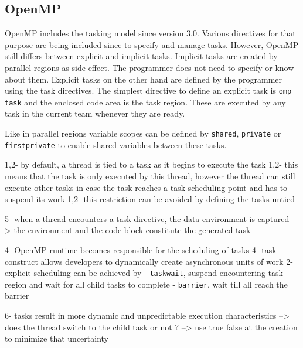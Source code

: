 \subsection{OpenMP}
\label{subsec:OpenMP}



  OpenMP includes the tasking model since version 3.0.
  Various directives for that purpose are being included since to specify and manage  tasks.
  However, OpenMP still differs between explicit and implicit tasks.
  Implicit tasks are created by parallel regions as side effect.
  The programmer does not need to specify or know about them.
  Explicit tasks on the other hand are defined by the programmer using the task directives.
  The simplest directive to define an explicit task is \texttt{omp task} and the enclosed code area is the task region.
  These are executed by any task in the current team whenever they are ready.~\cite{Ayguade.2009}~\cite{LaGrone.2011} 

  Like in parallel regions variable scopes can be defined by \texttt{shared}, \texttt{private} or \texttt{firstprivate} to enable shared variables between these tasks.
  


  1,2- by default, a thread is tied to a task as it begins to execute the task
    1,2- this means that the task is only executed by this thread, however the thread can still execute other tasks in case the task reaches a task scheduling point and has to suspend its work
    1,2- this restriction can be avoided by defining the tasks untied
    
  5- when a thread encounters a task directive, the data environment is captured
  		--> the environment and the code block constitute the generated task


  4- OpenMP runtime becomes responsible for the scheduling of tasks
  4- task construct allows developers to dynamically create asynchronous units of work
  2- explicit scheduling can be achieved by 
      - \texttt{taskwait}, suspend encountering task region and wait for all child tasks to complete
      - \texttt{barrier}, wait till all reach the barrier

  6- tasks result in more dynamic and unpredictable execution characteristics
  	--> does the thread switch to the child task or not ? --> use true false at the creation to minimize that uncertainty


